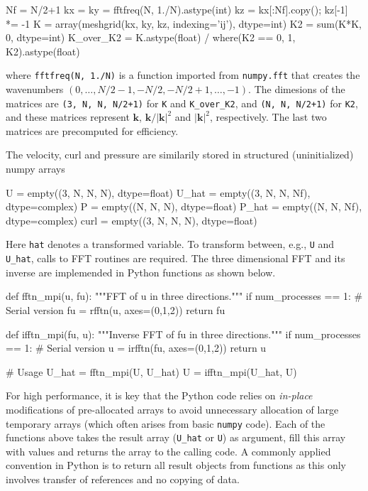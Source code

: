 \documentclass[11pt, oneside]{article}
\newcommand{\inpyth}{\lstinline[style=pythonstyle, basicstyle=\ttfamily]} %[]%
\begin{document}
\begin{python}
Nf = N/2+1
kx = ky = fftfreq(N, 1./N).astype(int)
kz = kx[:Nf].copy(); kz[-1] *= -1
K = array(meshgrid(kx, ky, kz, indexing='ij'), dtype=int)
K2 = sum(K*K, 0, dtype=int)
K_over_K2 = K.astype(float) / where(K2 == 0, 1, K2).astype(float)
\end{python}
where \inpyth{fftfreq(N, 1./N)} is a function imported from \inpyth{numpy.fft} that creates the wavenumbers $(0, \ldots, N/2-1, -N/2, -N/2+1, \ldots, -1)$. The dimesions of the matrices are \inpyth{(3, N, N, N/2+1)} for \texttt{K} and \texttt{K\_over\_K2}, and \inpyth{(N, N, N/2+1)} for \texttt{K2}, and these matrices represent $\bm{k}$, $\bm{k}/|\bm{k}|^2$ and $|\bm{k}|^2$, respectively. The last two matrices are precomputed for efficiency.

The velocity, curl and pressure are similarily stored in structured (uninitialized) numpy arrays

\begin{python}
U     = empty((3, N, N, N),  dtype=float)
U_hat = empty((3, N, N, Nf), dtype=complex)
P     = empty((N, N, N),     dtype=float)
P_hat = empty((N, N, Nf),    dtype=complex)
curl  = empty((3, N, N, N),  dtype=float)
\end{python}
Here \inpyth{hat} denotes a transformed variable. To transform between, e.g., \inpyth{U} and \inpyth{U_hat}, calls to FFT routines are required. The three dimensional FFT and its inverse are implemended in Python functions as shown below.

\begin{python}
def fftn_mpi(u, fu):
    """FFT of u in three directions."""
    if num_processes == 1:                # Serial version
        fu = rfftn(u, axes=(0,1,2))
    return fu

def ifftn_mpi(fu, u):
    """Inverse FFT of fu in three directions."""
    if num_processes == 1:                # Serial version
        u = irfftn(fu, axes=(0,1,2))
    return u

# Usage
U_hat = fftn_mpi(U, U_hat)
U = ifftn_mpi(U_hat, U)
\end{python}
For high performance, it is key that the Python code relies on \emph{in-place}
modifications of pre-allocated arrays to avoid unnecessary allocation of
large temporary arrays (which often arises from basic \texttt{numpy} code).
Each of the functions above takes the result array (\texttt{U\_hat} or
\texttt{U}) as argument, fill this array with values and returns the
array to the calling code. A commonly applied convention in
Python is to return all result objects from functions as this only involves
transfer of references and no copying of data.
\end{document}
